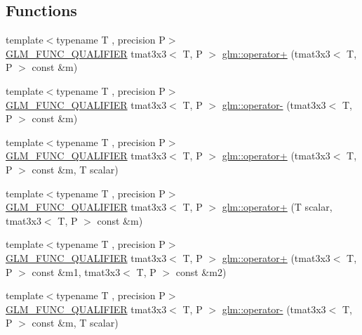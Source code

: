 \subsection*{Functions}
\begin{DoxyCompactItemize}
\item 
{\footnotesize template$<$typename T , precision P$>$ }\\\mbox{\hyperlink{setup_8hpp_a33fdea6f91c5f834105f7415e2a64407}{G\+L\+M\+\_\+\+F\+U\+N\+C\+\_\+\+Q\+U\+A\+L\+I\+F\+I\+ER}} tmat3x3$<$ T, P $>$ \mbox{\hyperlink{namespaceglm_a1a84bec33e1d2b50b7707e1b5dcba723}{glm\+::operator+}} (tmat3x3$<$ T, P $>$ const \&m)
\item 
{\footnotesize template$<$typename T , precision P$>$ }\\\mbox{\hyperlink{setup_8hpp_a33fdea6f91c5f834105f7415e2a64407}{G\+L\+M\+\_\+\+F\+U\+N\+C\+\_\+\+Q\+U\+A\+L\+I\+F\+I\+ER}} tmat3x3$<$ T, P $>$ \mbox{\hyperlink{namespaceglm_a0106ce96b46df77919c888f5a454cc40}{glm\+::operator-\/}} (tmat3x3$<$ T, P $>$ const \&m)
\item 
{\footnotesize template$<$typename T , precision P$>$ }\\\mbox{\hyperlink{setup_8hpp_a33fdea6f91c5f834105f7415e2a64407}{G\+L\+M\+\_\+\+F\+U\+N\+C\+\_\+\+Q\+U\+A\+L\+I\+F\+I\+ER}} tmat3x3$<$ T, P $>$ \mbox{\hyperlink{namespaceglm_a0730719ff564c6144ad4613adf295ae2}{glm\+::operator+}} (tmat3x3$<$ T, P $>$ const \&m, T scalar)
\item 
{\footnotesize template$<$typename T , precision P$>$ }\\\mbox{\hyperlink{setup_8hpp_a33fdea6f91c5f834105f7415e2a64407}{G\+L\+M\+\_\+\+F\+U\+N\+C\+\_\+\+Q\+U\+A\+L\+I\+F\+I\+ER}} tmat3x3$<$ T, P $>$ \mbox{\hyperlink{namespaceglm_af74574356535672735c0cf2e5820f858}{glm\+::operator+}} (T scalar, tmat3x3$<$ T, P $>$ const \&m)
\item 
{\footnotesize template$<$typename T , precision P$>$ }\\\mbox{\hyperlink{setup_8hpp_a33fdea6f91c5f834105f7415e2a64407}{G\+L\+M\+\_\+\+F\+U\+N\+C\+\_\+\+Q\+U\+A\+L\+I\+F\+I\+ER}} tmat3x3$<$ T, P $>$ \mbox{\hyperlink{namespaceglm_a356ed6fa88f4ee6805c31b33ad9e4cd7}{glm\+::operator+}} (tmat3x3$<$ T, P $>$ const \&m1, tmat3x3$<$ T, P $>$ const \&m2)
\item 
{\footnotesize template$<$typename T , precision P$>$ }\\\mbox{\hyperlink{setup_8hpp_a33fdea6f91c5f834105f7415e2a64407}{G\+L\+M\+\_\+\+F\+U\+N\+C\+\_\+\+Q\+U\+A\+L\+I\+F\+I\+ER}} tmat3x3$<$ T, P $>$ \mbox{\hyperlink{namespaceglm_a95cc6a86bd84683d8eb527067d65bdfe}{glm\+::operator-\/}} (tmat3x3$<$ T, P $>$ const \&m, T scalar)

\end{DoxyCompactItemize}
